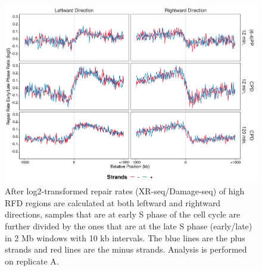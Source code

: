 \begin{figure}[H]
    \begin{center}
    \includegraphics[width=\textwidth]{Chapters/7_appendix/figures/supfig72}
    \caption[Repair rate early/late ratio of high RFDs in 2 Mb (replicate A).]{After log2-transformed repair rates (XR-seq/Damage-seq) of high RFD regions are calculated at both leftward and rightward directions, samples that are at early S phase of the cell cycle are further divided by the ones that are at the late S phase (early/late) in 2 Mb windows with 10 kb intervals. The blue lines are the plus strands and red lines are the minus strands. Analysis is performed on replicate A.}
    \label{supfig:rrel2000rfdA}
    \end{center}
    \end{figure}

